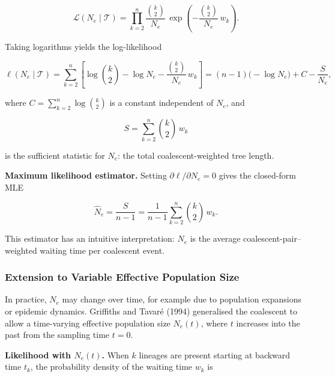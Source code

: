 \documentclass[11pt, a4paper]{article}
\begin{document}
\begin{equation}
    \mathcal{L}(N_e \mid \mathcal{T})
    = \prod_{k=2}^{n}
      \frac{\binom{k}{2}}{N_e}\,
      \exp\!\left(-\frac{\binom{k}{2}}{N_e}\,w_k\right).
    \label{eq:coallikelihood}
\end{equation}

Taking logarithms yields the log-likelihood

\begin{equation}
    \ell(N_e \mid \mathcal{T})
    = \sum_{k=2}^{n}\left[\log\binom{k}{2} - \log N_e
      - \frac{\binom{k}{2}}{N_e}\,w_k\right]
    = (n-1)\bigl(-\log N_e\bigr) + C - \frac{S}{N_e},
    \label{eq:loglik}
\end{equation}

where $C = \sum_{k=2}^{n}\log\binom{k}{2}$ is a constant independent of $N_e$, and

\begin{equation}
    S = \sum_{k=2}^{n} \binom{k}{2}\,w_k
    \label{eq:sstat}
\end{equation}

is the sufficient statistic for $N_e$: the total coalescent-weighted tree length.

\medskip
\noindent\textbf{Maximum likelihood estimator.}
Setting $\partial\ell/\partial N_e = 0$ gives the closed-form MLE

\begin{equation}
    \hat{N}_e = \frac{S}{n-1}
              = \frac{1}{n-1}\sum_{k=2}^{n}\binom{k}{2}\,w_k.
    \label{eq:MLE}
\end{equation}

This estimator has an intuitive interpretation: $\hat{N}_e$ is the average
coalescent-pair--weighted waiting time per coalescent event.

\subsubsection{Extension to Variable Effective Population Size}

In practice, $N_e$ may change over time, for example due to population expansions or
epidemic dynamics. Griffiths and Tavaré (1994) \cite{griffiths1994} generalised the
coalescent to allow a time-varying effective population size $N_e(t)$, where $t$
increases into the past from the sampling time $t = 0$.

\medskip
\noindent\textbf{Likelihood with $N_e(t)$.}
When $k$ lineages are present starting at backward time $t_k$, the probability density
of the waiting time $w_k$ is
\end{document}

